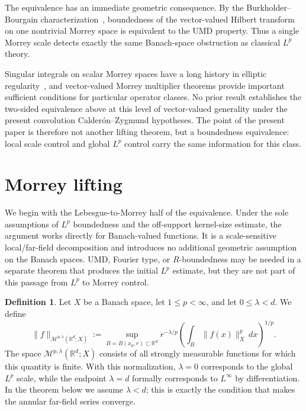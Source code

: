 \documentclass[11pt]{article}
\theoremstyle{definition}
\newtheorem{definition}[theorem]{Definition}
\newcommand{\R}{\mathbb R}
\begin{document}
The equivalence has an immediate geometric consequence. By the Burkholder--Bourgain characterization~\cite{Burkholder1983,Bourgain1983}, boundedness of the vector-valued Hilbert transform on one nontrivial Morrey space is equivalent to the UMD property. Thus a single Morrey scale detects exactly the same Banach-space obstruction as classical $L^p$ theory.

Singular integrals on scalar Morrey spaces have a long history in elliptic regularity~\cite{Peetre1969Morrey,ChiarenzaFrasca1987,Lieberman2003}, and vector-valued Morrey multiplier theorems provide important sufficient conditions for particular operator classes. No prior result establishes the two-sided equivalence above at this level of vector-valued generality under the present convolution Calder\'on--Zygmund hypotheses. The point of the present paper is therefore not another lifting theorem, but a boundedness equivalence: local scale control and global $L^p$ control carry the same information for this class.
\section{Morrey lifting}\label{sec:morrey-lifting}

	We begin with the Lebesgue-to-Morrey half of the equivalence. Under the sole assumptions of $L^p$ boundedness and the off-support kernel-size estimate, the argument works directly for Banach-valued functions. It is a scale-sensitive local/far-field decomposition and introduces no additional geometric assumption on the Banach spaces. UMD, Fourier type, or $R$-boundedness may be needed in a separate theorem that produces the initial $L^p$ estimate, but they are not part of this passage from $L^p$ to Morrey control.

	\begin{definition}\label{def:spatial-morrey}
		Let $X$ be a Banach space, let $1\le p<\infty$, and let $0\le \lambda<d$.  We define
		\[
		\|f\|_{\mathcal M^{p,\lambda}(\R^d;X)}
		:=
		\sup_{B=B(x_0,r)\subset\R^d}
		r^{-\lambda/p}
		\left(\int_B\|f(x)\|_X^p\,dx\right)^{1/p}.
		\]
		The space $\mathcal M^{p,\lambda}(\R^d;X)$ consists of all strongly measurable functions for which this quantity is finite.  With this normalization, $\lambda=0$ corresponds to the global $L^p$ scale, while the endpoint $\lambda=d$ formally corresponds to $L^\infty$ by differentiation.  In the theorem below we assume $\lambda<d$; this is exactly the condition that makes the annular far-field series converge.
	\end{definition}
\end{document}
